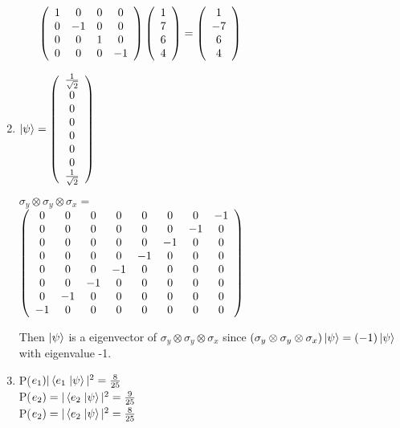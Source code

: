 \documentclass[11pt,fleqn]{article}
\begin{document}
\begin{enumerate}
\begin{enumerate}
$\left(\begin{array}{c c c c} 
1 & 0& 0& 0 \\
0 & -1 & 0 & 0 \\
0 & 0 & 1 & 0 \\
0 & 0 & 0 & -1
\end{array}\right)
\left(\begin{array}{c} 
1\\ 
7\\ 
6\\
4 
\end{array}\right)=
\left(\begin{array}{c} 
1\\ 
-7\\ 
6\\
4 
\end{array}\right)$

\end{enumerate}
\item %
$\left | \psi \right \rangle = 
\left(\begin{array}{c} 
\frac{1}{\sqrt{2}} \\
0\\ 
0\\ 
0\\
0\\
0\\
0\\
\frac{1}{\sqrt{2}} 
\end{array}\right)
$

$\sigma_{y} \otimes \sigma_{y} \otimes \sigma_{x} = $ \\
$\left(\begin{array}{c c c c c c c c}
0 & 0 & 0 & 0 & 0 & 0 & 0 & -1\\
0 & 0 & 0 & 0 & 0 & 0 & -1 & 0 \\
0 & 0 & 0 & 0 & 0 & -1 & 0 & 0 \\
0 & 0 & 0 & 0 & -1 & 0 & 0 & 0 \\
0 & 0 & 0 & -1 & 0 & 0 & 0 & 0 \\
0 & 0 & -1 & 0 & 0 & 0 & 0 & 0 \\
0 & -1 & 0 & 0 & 0 & 0 & 0 & 0 \\
-1 & 0 & 0 & 0 & 0 & 0 & 0 & 0 
\end{array}\right)$

Then $\left | \psi \right \rangle$ is a eigenvector of $\sigma_{y} \otimes \sigma_{y} \otimes \sigma_{x}$ since $(\sigma_{y} \otimes \sigma_{y} \otimes \sigma_{x})\left | \psi \right \rangle = (-1)\left | \psi \right \rangle$ with eigenvalue -1. 

\item %
 P($e_{1}) |\left \langle e_{1} \right. \left | \psi \right \rangle|^{2} = \frac{8}{25}$ \\
 P($e_{2})= |\left \langle e_{2} \right. \left | \psi \right \rangle|^{2} = \frac{9}{25}$ \\
 P($e_{2})= |\left \langle e_{2} \right. \left | \psi \right \rangle|^{2} = \frac{8}{25}$


\end{enumerate}
\end{document}
